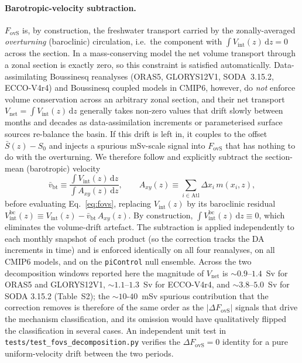 \documentclass[12pt,a4paper]{article}
\newcommand{\Fovs}{F_\mathrm{ovS}}
\begin{document}
\paragraph{Barotropic-velocity subtraction.}
$\Fovs$ is, by construction, the freshwater transport carried by
the zonally-averaged \emph{overturning} (baroclinic) circulation,
i.e.\ the component with $\int V_\mathrm{int}(z)\,\mathrm{d}z = 0$
across the section. In a mass-conserving model the net volume
transport through a zonal section is exactly zero, so this
constraint is satisfied automatically. Data-assimilating Boussinesq
reanalyses (ORAS5, GLORYS12V1, SODA~3.15.2, ECCO-V4r4) and
Boussinesq coupled models in CMIP6, however, do \emph{not} enforce
volume conservation across an arbitrary zonal section, and their
net transport $V_\mathrm{net} = \int V_\mathrm{int}(z)\,\mathrm{d}z$
generally takes non-zero values that drift slowly between months and
decades as data-assimilation increments or parameterised surface
sources re-balance the basin. If this drift is left in, it couples
to the offset $\bar{S}(z) - S_0$ and injects a spurious mSv-scale
signal into $\Fovs$ that has nothing to do with the overturning.
We therefore follow \citet{deVriesWeber2005, Mecking2017, Weijer2019}
and explicitly subtract the section-mean (barotropic) velocity
\begin{equation}
\bar{v}_\mathrm{bt} \equiv
   \frac{\int V_\mathrm{int}(z)\,\mathrm{d}z}
        {\int A_{xy}(z)\,\mathrm{d}z},
  \qquad
A_{xy}(z) \equiv \sum_{i\in\mathrm{Atl}} \Delta x_i\,m(x_i, z),
\label{eq:vbar}
\end{equation}
before evaluating Eq.~\eqref{eq:fovs}, replacing $V_\mathrm{int}(z)$
by its baroclinic residual
$V_\mathrm{int}^{\mathrm{bc}}(z) \equiv V_\mathrm{int}(z) -
\bar{v}_\mathrm{bt}\,A_{xy}(z)$. By construction,
$\int V_\mathrm{int}^{\mathrm{bc}}(z)\,\mathrm{d}z \equiv 0$, which
eliminates the volume-drift artefact. The subtraction is applied
independently to each monthly snapshot of each product (so the
correction tracks the DA increments in time) and is enforced
identically on all four reanalyses, on all CMIP6 models, and on the
\texttt{piControl} null ensemble. Across the two decomposition
windows reported here the magnitude of $V_\mathrm{net}$ is
$\sim 0.9$--$1.4$~Sv for ORAS5 and GLORYS12V1, $\sim 1.1$--$1.3$~Sv
for ECCO-V4r4, and $\sim 3.8$--$5.0$~Sv for SODA 3.15.2
(Table~S2); the $\sim 10$-$40$~mSv spurious contribution that the
correction removes is therefore of the same order as the
$|\Delta\Fovs|$ signals that drive the mechanism classification,
and its omission would have qualitatively flipped the classification
in several cases. An independent unit test in
\texttt{tests/test\_fovs\_decomposition.py} verifies the
$\Delta\Fovs = 0$ identity for a pure uniform-velocity drift
between the two periods.
\end{document}

